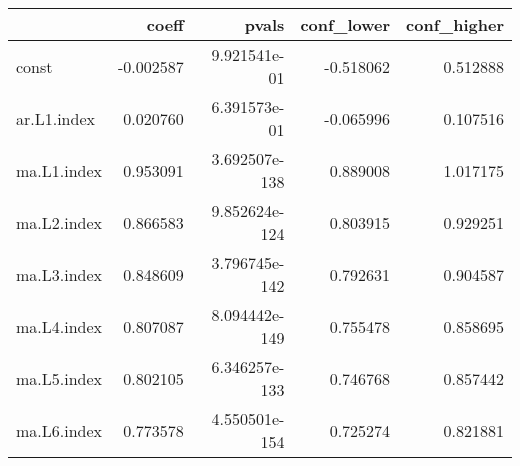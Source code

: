\begin{tabular}{lrrrr}
\toprule
{} &     coeff &          pvals &  conf\_lower &  conf\_higher \\
\midrule
const       & -0.002587 &   9.921541e-01 &   -0.518062 &     0.512888 \\
ar.L1.index &  0.020760 &   6.391573e-01 &   -0.065996 &     0.107516 \\
ma.L1.index &  0.953091 &  3.692507e-138 &    0.889008 &     1.017175 \\
ma.L2.index &  0.866583 &  9.852624e-124 &    0.803915 &     0.929251 \\
ma.L3.index &  0.848609 &  3.796745e-142 &    0.792631 &     0.904587 \\
ma.L4.index &  0.807087 &  8.094442e-149 &    0.755478 &     0.858695 \\
ma.L5.index &  0.802105 &  6.346257e-133 &    0.746768 &     0.857442 \\
ma.L6.index &  0.773578 &  4.550501e-154 &    0.725274 &     0.821881 \\
\bottomrule
\end{tabular}
